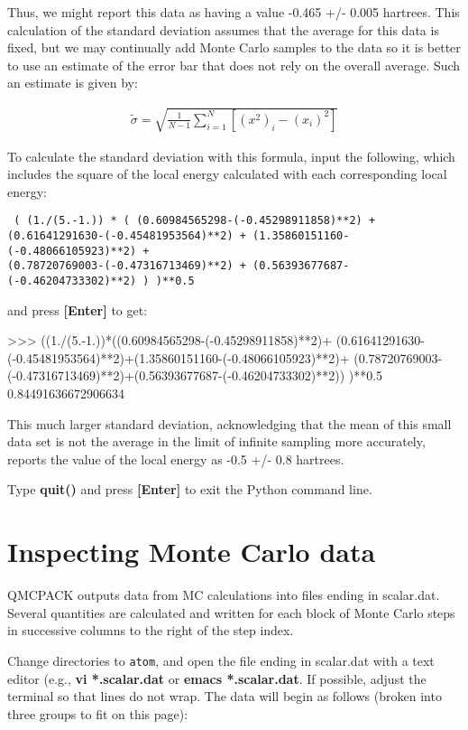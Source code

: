 Thus, we might report this data as having a value -0.465 +/- 0.005 hartrees.
This calculation of the standard deviation assumes that the average for this
data is fixed, but we may continually add Monte Carlo samples to the data so it
is better to use an estimate of the error bar that does not rely on the overall
average.  Such an estimate is given by:

\begin{align}
  \tilde{\sigma} = \sqrt{\frac{1}{N-1}\sum_{i=1}^{N} \left[{(x^2)}_i - ({x_i})^2\right]}
\end{align}

To calculate the standard deviation with this formula, input the following,
which includes the square of the local energy calculated with each
corresponding local energy:

\texttt{
( (1./(5.-1.)) * ( 
(0.60984565298-(-0.45298911858)**2) + \\
(0.61641291630-(-0.45481953564)**2) + 
(1.35860151160-(-0.48066105923)**2) + \\
(0.78720769003-(-0.47316713469)**2) + 
(0.56393677687-(-0.46204733302)**2) ) 
)**0.5
}

and press \textbf{[Enter]} to get:

\begin{shade}
>>> ((1./(5.-1.))*((0.60984565298-(-0.45298911858)**2)+ 
(0.61641291630-(-0.45481953564)**2)+(1.35860151160-(-0.48066105923)**2)+ 
(0.78720769003-(-0.47316713469)**2)+(0.56393677687-(-0.46204733302)**2))
)**0.5
0.84491636672906634
\end{shade}

This much larger standard deviation, acknowledging that the mean of this small
data set is not the average in the limit of infinite sampling more accurately,
reports the value of the local energy as -0.5 +/- 0.8 hartrees.

Type \textbf{quit()} and press \textbf{[Enter]} to exit the Python command line.

\section{Inspecting Monte Carlo data}
\label{sec:inspect_data} 

QMCPACK outputs data from MC calculations into files ending in scalar.dat.
Several quantities are calculated and written for each block of Monte Carlo
steps in successive columns to the right of the step index. 

Change directories to \texttt{atom}, and open the file ending in
scalar.dat with a text editor (e.g., \textbf{vi *.scalar.dat} or \textbf{emacs
*.scalar.dat}.  If possible, adjust the terminal so that lines do not wrap.
The data will begin as follows (broken into three groups to fit on this page):


